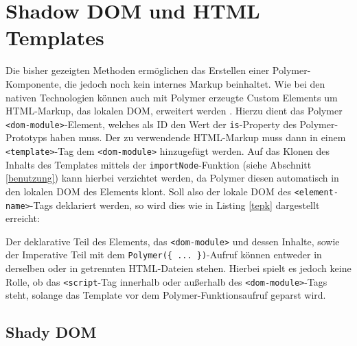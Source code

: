 \section{Shadow DOM und HTML Templates}\label{shadow-dom-und-html-templates}

Die bisher gezeigten Methoden ermöglichen das Erstellen einer Polymer-Komponente, die jedoch noch kein internes Markup beinhaltet. Wie bei den nativen Technologien können auch mit Polymer erzeugte Custom Elements um \ac{HTML}-Markup, das lokalen \ac{DOM}, erweitert werden \cite{citeulike:13915080}. Hierzu dient das Polymer \texttt{\textless{}dom-module\textgreater{}}-Element, welches als ID den Wert der \texttt{is}-Property des Polymer-Prototyps haben muss. Der zu verwendende \ac{HTML}-Markup muss dann in einem \texttt{\textless{}template\textgreater{}}-Tag dem \texttt{\textless{}dom-module\textgreater{}} hinzugefügt werden. Auf das Klonen des Inhalts des Templates mittels der \texttt{importNode}-Funktion (siehe Abschnitt \ref{benutzung}) kann hierbei verzichtet werden, da Polymer diesen automatisch in den lokalen \ac{DOM} des Elements klont. Soll also der lokale \ac{DOM} des \texttt{\textless{}element-name\textgreater{}}-Tags deklariert werden, so wird dies wie in Listing \ref{tepk} dargestellt erreicht:



Der deklarative Teil des Elements, das \texttt{\textless{}dom-module\textgreater{}} und dessen Inhalte, sowie der Imperative Teil mit dem \texttt{Polymer(\{\ ...\ \})}-Aufruf können entweder in derselben oder in getrennten \ac{HTML}-Dateien stehen. Hierbei spielt es jedoch keine Rolle, ob das \texttt{\textless{}script}-Tag innerhalb oder außerhalb des \texttt{\textless{}dom-module\textgreater{}}-Tags steht, solange das Template vor dem Polymer-Funktionsaufruf geparst wird.


\subsection{Shady DOM}\label{shady-dom}

